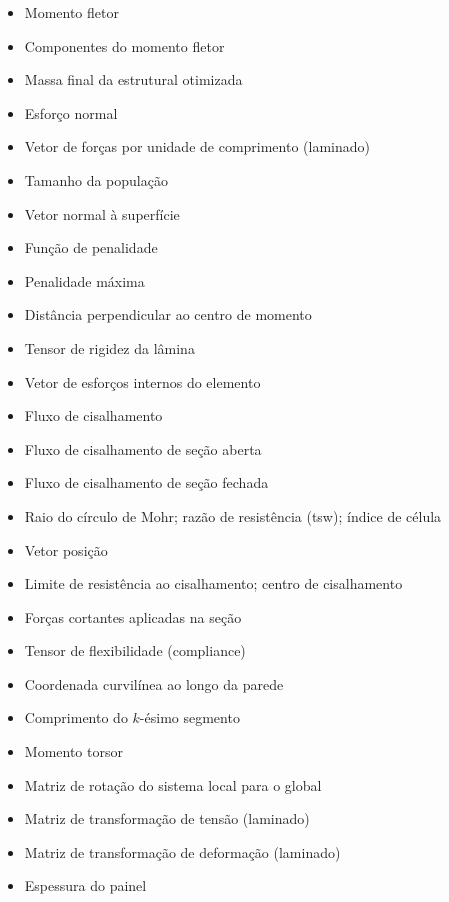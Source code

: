 {\begin{itemize}[
        labelwidth=1.5cm,
        align=left,
        itemindent=0cm,
        leftmargin=2cm,
        itemsep=0em
    ]
    \item[$M$] Momento fletor
    \item[$M_x, M_y$] Componentes do momento fletor
    \item[$m^\star$] Massa final da estrutural otimizada
    \item[$N$] Esforço normal
    \item[$\{\mathbf{N}\}$] Vetor de forças por unidade de comprimento (laminado)
    \item[$\mathrm{NP}$] Tamanho da população
    \item[$\hat{n}$] Vetor normal à superfície
    \item[$\mathrm{P}(\mathbf{x})$] Função de penalidade
    \item[$P_\text{cap}$] Penalidade máxima
    \item[$p_0$] Distância perpendicular ao centro de momento
    \item[$Q_{ij}$] Tensor de rigidez da lâmina
    \item[$\{\mathbf{Q}\}$] Vetor de esforços internos do elemento
    \item[$q$] Fluxo de cisalhamento
    \item[$q_b$] Fluxo de cisalhamento de seção aberta
    \item[$q_{s,0}$] Fluxo de cisalhamento de seção fechada
    \item[$R$] Raio do círculo de Mohr;
    razão de resistência (\acrshort{tsw});
    índice de célula
    \item[$\vv{r}$] Vetor posição
    \item[$S$] Limite de resistência ao cisalhamento;
    centro de cisalhamento
    \item[$S_x, S_z$] Forças cortantes aplicadas na seção
    \item[$S_{ijkl}$] Tensor de flexibilidade (compliance)
    \item[$s$] Coordenada curvilínea ao longo da parede
    \item[$s_k$] Comprimento do $k$-ésimo segmento
    \item[$T$] Momento torsor
    \item[$\mathbf{[T]}$] Matriz de rotação do sistema local para o global
    \item[$\mathbf{[T_\sigma^\pm]}$] Matriz de transformação de tensão (laminado)
    \item[$\mathbf{[T_\epsilon^\pm]}$] Matriz de transformação de deformação (laminado)
    \item[$t$] Espessura do painel

\end{itemize}}
